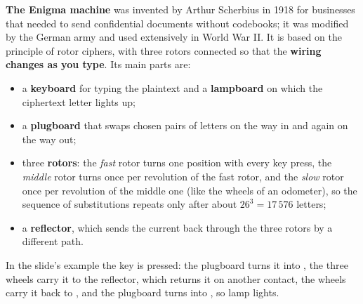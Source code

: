 \textbf{The Enigma machine} was invented by Arthur Scherbius in 1918 for businesses that needed to send confidential documents without codebooks; it was modified by the German army and used extensively in World War II. It is based on the principle of rotor ciphers, with three rotors connected so that the \textbf{wiring changes as you type}. Its main parts are:
\begin{itemize}[leftmargin=1.4em]
  \item a \textbf{keyboard} for typing the plaintext and a \textbf{lampboard} on which the ciphertext letter lights up;
  \item a \textbf{plugboard} that swaps chosen pairs of letters on the way in and again on the way out;
  \item three \textbf{rotors}: the \emph{fast} rotor turns one position with every key press, the \emph{middle} rotor turns once per revolution of the fast rotor, and the \emph{slow} rotor once per revolution of the middle one (like the wheels of an odometer), so the sequence of substitutions repeats only after about $26^3 = 17\,576$ letters;
  \item a \textbf{reflector}, which sends the current back through the three rotors by a different path.
\end{itemize}
\begin{center}
\end{center}
In the slide's example the key  is pressed: the plugboard turns it into , the three wheels carry it to the reflector, which returns it on another contact, the wheels carry it back to , and the plugboard turns  into , so lamp  lights.

